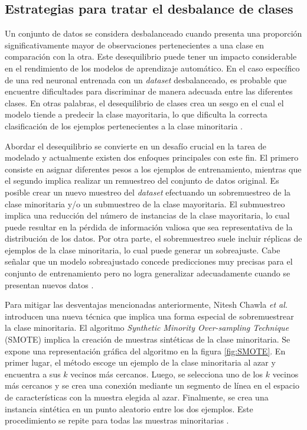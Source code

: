 \subsection{Estrategias para tratar el desbalance de clases}

Un conjunto de datos se considera desbalanceado cuando presenta una proporción significativamente mayor 
de observaciones pertenecientes a una clase en comparación con la otra. Este desequilibrio puede tener 
un impacto considerable en el rendimiento de los modelos de aprendizaje automático. En el caso específico 
de una red neuronal entrenada con un \emph{dataset} desbalanceado, es probable que encuentre dificultades 
para discriminar de manera adecuada entre las diferentes clases. En otras palabras, el desequilibrio de 
clases crea un sesgo en el cual el modelo tiende a predecir la clase mayoritaria, lo que dificulta la 
correcta clasificación de los ejemplos pertenecientes a la clase minoritaria \citep{CITE:36} \citep{CITE:37}. 

Abordar el desequilibrio se convierte en un desafío crucial en la tarea de modelado y actualmente existen 
dos enfoques principales con este fin. El primero consiste en asignar diferentes pesos a los ejemplos de entrenamiento, 
mientras que el segundo implica realizar un remuestreo del conjunto de datos original. Es posible crear 
un nuevo muestreo del \emph{dataset} efectuando un sobremuestreo de la clase minoritaria y/o un submuestreo 
de la clase mayoritaria. El submuestreo implica una reducción del número de instancias de la clase mayoritaria, 
lo cual puede resultar en la pérdida de información valiosa que sea representativa de la distribución de los 
datos. Por otra parte, el sobremuestreo suele incluir réplicas de ejemplos de la clase minoritaria, lo cual 
puede generar un sobreajuste. Cabe señalar que un modelo sobreajustado concede predicciones 
muy precisas para el conjunto de entrenamiento pero no logra generalizar adecuadamente cuando se presentan 
nuevos datos \citep{CITE:37}. 

Para mitigar las desventajas mencionadas anteriormente, Nitesh Chawla \emph{et al.} \citep{CITE:37} 
introducen una nueva técnica que implica una forma especial 
de sobremuestrear la clase minoritaria. El algoritmo 
\emph{Synthetic Minority Over-sampling Technique} (SMOTE) implica la creación de muestras sintéticas de 
la clase minoritaria. Se expone una representación gráfica del algoritmo en la figura \ref{fig:SMOTE}. 
En primer lugar, el método escoge un ejemplo de la clase minoritaria al azar y encuentra a sus $k$ vecinos 
más cercanos. Luego, se selecciona uno de los $k$ vecinos más cercanos y se crea una conexión mediante 
un segmento de línea en el espacio de características con la muestra elegida al azar. Finalmente, se crea 
una instancia sintética en un punto aleatorio entre los dos ejemplos. Este procedimiento se repite para
todas las muestras minoritarias \citep{CITE:38}. 

